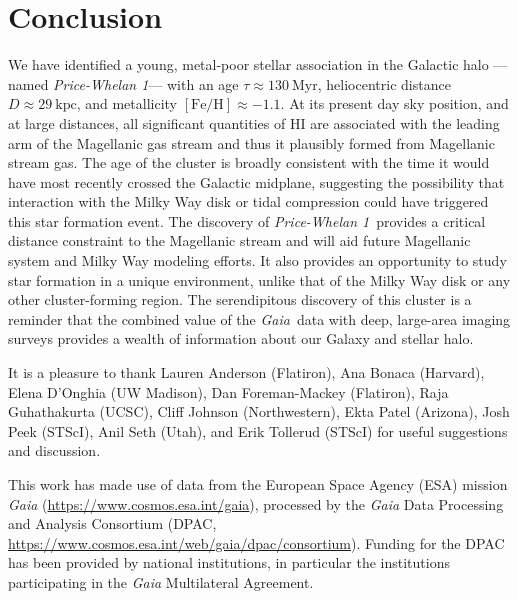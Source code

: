 \documentclass[modern]{aastex62}
\newcommand{\gaia}{\textsl{Gaia}}
\newcommand{\feh}{\ensuremath{[\textrm{Fe} / \textrm{H}]}}
\newcommand{\hi}{H{\footnotesize I} }
\newcommand{\clustername}{\textsl{Price-Whelan 1}}
\newcommand{\clage}{\ensuremath{130~\textrm{Myr}}}
\newcommand{\clfeh}{\ensuremath{-1.1}}
\newcommand{\cldist}{\ensuremath{29~\textrm{kpc}}}
\begin{document}
%
%
%
%


\section{Conclusion} \label{sec:conclusion}

We have identified a young, metal-poor stellar association in the Galactic halo --- named \clustername --- with an age $\tau \approx \clage$, heliocentric distance $D \approx \cldist$, and metallicity $\feh \approx \clfeh$.
At its present day sky position, and at large distances, all significant quantities of \hi are associated with the leading arm of the Magellanic gas stream and thus it plausibly formed from Magellanic stream gas.
The age of the cluster is broadly consistent with the time it would have most recently crossed the Galactic midplane, suggesting the possibility that interaction with the Milky Way disk or tidal compression could have triggered this star formation event.
The discovery of \clustername\ provides a critical distance constraint to the Magellanic stream and will aid future Magellanic system and Milky Way modeling efforts.
It also provides an opportunity to study star formation in a unique environment, unlike that of the Milky Way disk or any other cluster-forming region.
The serendipitous discovery of this cluster is a reminder that the combined value of the \gaia\ data with deep, large-area imaging surveys provides a wealth of information about our Galaxy and stellar halo.


\acknowledgments

It is a pleasure to thank
Lauren Anderson (Flatiron),
Ana Bonaca (Harvard),
Elena D'Onghia (UW Madison),
Dan Foreman-Mackey (Flatiron),
Raja Guhathakurta (UCSC),
Cliff Johnson (Northwestern),
Ekta Patel (Arizona),
Josh Peek (STScI),
Anil Seth (Utah),
and Erik Tollerud (STScI)
for useful suggestions and discussion.

This work has made use of data from the European Space Agency (ESA)
mission {\it Gaia} (\url{https://www.cosmos.esa.int/gaia}), processed by
the {\it Gaia} Data Processing and Analysis Consortium (DPAC,
\url{https://www.cosmos.esa.int/web/gaia/dpac/consortium}). Funding
for the DPAC has been provided by national institutions, in particular
the institutions participating in the {\it Gaia} Multilateral Agreement.
\end{document}

